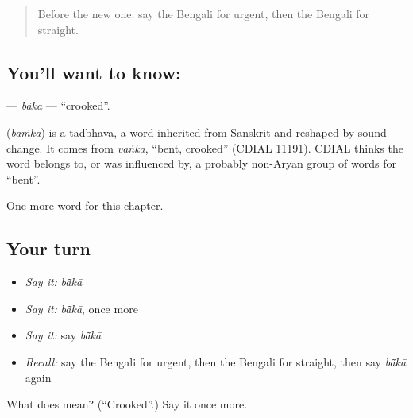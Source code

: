 \label{lesson:BN-C139-baka}



\begin{quote}
Before the new one: say the Bengali for urgent, then the Bengali for straight.
\end{quote}

\subsection*{You'll want to know: }
\textbf{} — \emph{bā̃kā} — \textquotedblleft{}crooked\textquotedblright{}.

\begin{cousinweb}
\textbf{} (\emph{bāṁkā}) is a tadbhava, a word inherited from Sanskrit and reshaped by sound change. It comes from \emph{vaṅka}, \textquotedblleft{}bent, crooked\textquotedblright{} (CDIAL 11191). CDIAL thinks the word belongs to, or was influenced by, a probably non-Aryan group of words for \textquotedblleft{}bent\textquotedblright{}.
\end{cousinweb}

\begin{grammarlens}[title={What you've built}]
One more word for this chapter.
\end{grammarlens}

\subsection*{Your turn}
\begin{itemize}
\raggedright
  \item \emph{Say it:} \emph{bā̃kā}
  \item \emph{Say it:} \emph{bā̃kā}, once more
  \item \emph{Say it:} say \emph{bā̃kā}
  \item \emph{Recall:} say the Bengali for urgent, then the Bengali for straight, then say \emph{bā̃kā} again
\end{itemize}

\begin{tcolorbox}[breakable,colback=teal!4,colframe=teal!35!black,title={Before you move on}]
What does  mean? (\textquotedblleft{}Crooked\textquotedblright{}.) Say it once more.
\end{tcolorbox}
